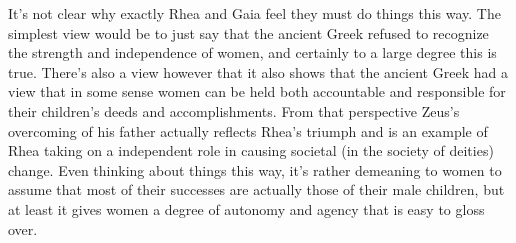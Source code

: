 \documentclass[letterpaper, reqno,11pt]{article}
\begin{document}
It's not clear why exactly Rhea and Gaia feel they must do things this way. The simplest view would be to just say that the ancient Greek refused to recognize the strength and independence of women, and certainly to a large degree this is true. There's also a view however that it also shows that the ancient Greek had a view that in some sense women can be held both accountable and responsible for their children's deeds and accomplishments. From that perspective Zeus's overcoming of his father actually reflects Rhea's triumph and is an example of Rhea taking on a independent role in causing societal (in the society of deities) change. Even thinking about things this way, it's rather demeaning to women to assume that most of their successes are actually those of their male children, but at least it gives women a degree of autonomy and agency that is easy to gloss over. 

\medskip
\end{document}

